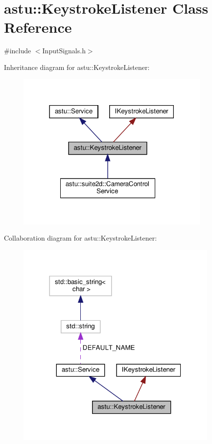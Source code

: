 \hypertarget{classastu_1_1KeystrokeListener}{}\section{astu\+:\+:Keystroke\+Listener Class Reference}
\label{classastu_1_1KeystrokeListener}


{\ttfamily \#include $<$Input\+Signals.\+h$>$}



Inheritance diagram for astu\+:\+:Keystroke\+Listener\+:\nopagebreak
\begin{figure}[H]
\begin{center}
\leavevmode
\includegraphics[width=270pt]{classastu_1_1KeystrokeListener__inherit__graph}
\end{center}
\end{figure}


Collaboration diagram for astu\+:\+:Keystroke\+Listener\+:\nopagebreak
\begin{figure}[H]
\begin{center}
\leavevmode
\includegraphics[width=281pt]{classastu_1_1KeystrokeListener__coll__graph}
\end{center}
\end{figure}
